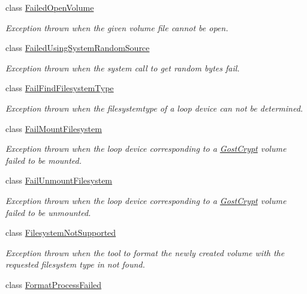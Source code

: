 \begin{DoxyCompactItemize}
class \hyperlink{class_gost_crypt_1_1_core_1_1_failed_open_volume}{Failed\+Open\+Volume}
\begin{DoxyCompactList}\small\item\em Exception thrown when the given volume file cannot be open. \end{DoxyCompactList}\item 
class \hyperlink{class_gost_crypt_1_1_core_1_1_failed_using_system_random_source}{Failed\+Using\+System\+Random\+Source}
\begin{DoxyCompactList}\small\item\em Exception thrown when the system call to get random bytes fail. \end{DoxyCompactList}\item 
class \hyperlink{class_gost_crypt_1_1_core_1_1_fail_find_filesystem_type}{Fail\+Find\+Filesystem\+Type}
\begin{DoxyCompactList}\small\item\em Exception thrown when the filesystemtype of a loop device can not be determined. \end{DoxyCompactList}\item 
class \hyperlink{class_gost_crypt_1_1_core_1_1_fail_mount_filesystem}{Fail\+Mount\+Filesystem}
\begin{DoxyCompactList}\small\item\em Exception thrown when the loop device corresponding to a \hyperlink{namespace_gost_crypt}{Gost\+Crypt} volume failed to be mounted. \end{DoxyCompactList}\item 
class \hyperlink{class_gost_crypt_1_1_core_1_1_fail_unmount_filesystem}{Fail\+Unmount\+Filesystem}
\begin{DoxyCompactList}\small\item\em Exception thrown when the loop device corresponding to a \hyperlink{namespace_gost_crypt}{Gost\+Crypt} volume failed to be unmounted. \end{DoxyCompactList}\item 
class \hyperlink{class_gost_crypt_1_1_core_1_1_filesystem_not_supported}{Filesystem\+Not\+Supported}
\begin{DoxyCompactList}\small\item\em Exception thrown when the tool to format the newly created volume with the requested filesystem type in not found. \end{DoxyCompactList}\item 
class \hyperlink{class_gost_crypt_1_1_core_1_1_format_process_failed}{Format\+Process\+Failed}

\end{DoxyCompactItemize}
